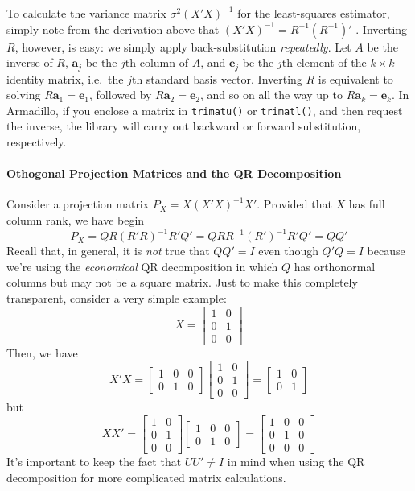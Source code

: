 \documentclass[12pt]{article}
\theoremstyle{definition}
\begin{document}
To calculate the variance matrix $\sigma^2 (X'X)^{-1}$ for the least-squares estimator, simply note from the derivation above that $(X'X)^{-1} = R^{-1} (R^{-1})'$ . Inverting $R$, however, is easy: we simply apply back-substitution \emph{repeatedly}. Let $A$ be the inverse of $R$, $\mathbf{a}_j$ be the $j$th column of $A$, and $\mathbf{e}_j$ be the $j$th element of the $k\times k$ identity matrix, i.e.\ the $j$th standard basis vector. Inverting $R$ is equivalent to solving $R \mathbf{a}_1 = \mathbf{e}_1$, followed by $R \mathbf{a}_2 = \mathbf{e}_2$, and so on all the way up to $R \mathbf{a}_k = \mathbf{e}_k$. In Armadillo, if you enclose a matrix in \texttt{trimatu()} or \texttt{trimatl()}, and then request the inverse, the library will carry out backward or forward substitution, respectively.

\paragraph{Othogonal Projection Matrices and the QR Decomposition}
Consider a projection matrix $P_X = X (X'X)^{-1}X'$. Provided that $X$ has full column rank, we have
begin
  $$P_X  = QR(R'R)^{-1}R'Q' = QRR^{-1} (R')^{-1}R'Q' = QQ'$$
Recall that, in general, it is \emph{not} true that $QQ' = I$ even though $Q'Q = I$ because we're using the \emph{economical} QR decomposition in which $Q$ has orthonormal columns but may not be a square matrix. Just to make this completely transparent, consider a very simple example:
	$$X = \left[ \begin{array}
		{cc} 1 & 0 \\ 0 & 1 \\ 0 & 0
	\end{array}\right]$$
Then, we have
	$$X'X = \left[\begin{array}
		{ccc} 1& 0 & 0 \\ 0 & 1 & 0
	\end{array} \right]\left[ \begin{array}
		{cc} 1 & 0 \\ 0 & 1 \\ 0 & 0
	\end{array}\right] = \left[\begin{array}
		{cc} 1 & 0 \\ 0 & 1
	\end{array} \right]$$
but 
	$$XX' = \left[ \begin{array}
		{cc} 1 & 0 \\ 0 & 1 \\ 0 & 0
	\end{array}\right]\left[\begin{array}
		{ccc} 1& 0 & 0 \\ 0 & 1 & 0
	\end{array} \right] = \left[\begin{array}
		{ccc} 1 & 0 & 0 \\ 0 & 1 & 0 \\ 0 & 0 & 0
	\end{array} \right]$$
It's important to keep the fact that $UU' \neq I$ in mind when using the QR decomposition for more complicated matrix calculations.
\end{document}
